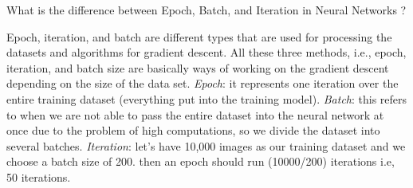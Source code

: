 \documentclass[12pt,a4paper]{exam}
\begin{document}
\question
What is the difference between Epoch, Batch, and Iteration in Neural Networks ?
\fillwithlines{3cm}
\begin{solution}
Epoch, iteration, and batch are different types that are used for processing the datasets and algorithms for gradient descent. All these three methods, i.e., epoch, iteration, and batch size are basically ways of working on the gradient descent depending on the size of the data set.
\emph{Epoch}: it represents one iteration over the entire training dataset (everything put into the training model).
\emph{Batch}: this refers to when we are not able to pass the entire dataset into the neural network at once due to the problem of high computations, so we divide the dataset into several batches.
\emph{Iteration}: let’s have 10,000 images as our training dataset and we choose a batch size of 200. then an epoch should run (10000/200) iterations i.e, 50 iterations.
\end{solution}
\end{document}

